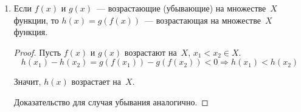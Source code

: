 \begin{enumerate}
\begin{proof}
	Доказательство для случая убывания аналогично.
	\end{proof}
	
	\item Если $f(x)$ и $g(x)$~--- возрастающие (убывающие) на множестве~$X$ функции, то $h(x) = g(f(x))$~--- возрастающая на множестве~$X$ функция.
	\begin{proof}
	Пусть $f(x)$ и $g(x)$ возрастают на~$X$, $x_1 < x_2 \in X$.
	\begin{equation*}
	h(x_1) - h(x_2) =
	g(f(x_1)) - g(f(x_2)) < 0 \Rightarrow
	h(x_1) < h(x_2)
	\end{equation*}
	
	Значит, $h(x)$ возрастает на~$X$.
	
	Доказательство для случая убывания аналогично.
	\end{proof}
\end{enumerate}